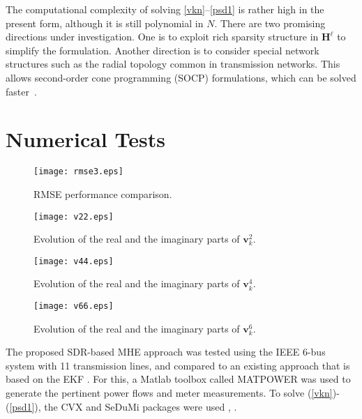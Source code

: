 \documentclass[conference]{IEEEtran}
\def\bbH{{\ensuremath{\mathbf H}}}
\def\bbv{{\ensuremath{\mathbf v}}}
\begin{document}
The computational complexity of solving \eqref{vkn}--\eqref{psd1} is rather high in the present form, although it is still polynomial in $N$. There are two promising directions under investigation. One is to exploit rich sparsity structure in $\bbH^\ell$ to simplify the formulation. Another direction is to consider special network structures such as the radial topology common in transmission networks. This allows second-order cone programming (SOCP) formulations, which can be solved faster~\cite{Far13}.

\section{Numerical Tests}
\label{sec5}


 \begin{figure}
\centering
\texttt{[image: rmse3.eps]}
\caption{RMSE performance comparison.}
\label{fig1}
\end{figure}

 \begin{figure}
\centering
\texttt{[image: v22.eps]}
\caption{Evolution of the real and the imaginary parts of $\bbv^{2}_k$.}
\label{fig2}
\end{figure}

 \begin{figure}
\centering
\texttt{[image: v44.eps]}
\caption{Evolution of the real and the imaginary parts of $\bbv^{4}_k$.}
\label{fig3}
\end{figure}

 \begin{figure}
\centering
\texttt{[image: v66.eps]}
\caption{Evolution of the real and the imaginary parts of $\bbv^{6}_k$.}
\label{fig4}
\end{figure}



The proposed SDR-based MHE approach was tested using the IEEE 6-bus system with 11 transmission lines, and compared to an existing approach that is based on the EKF \cite{HuS02}. For this, a Matlab toolbox called MATPOWER \cite{tps:thomas2011}
 was used to generate the pertinent power flows and meter measurements. To solve (\ref{vkn})-(\ref{psd1}), the CVX and SeDuMi packages were used \cite{cvx}, \cite{sedumi}.
\end{document}
